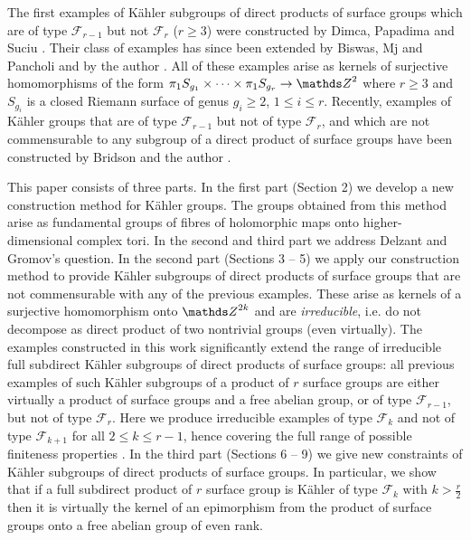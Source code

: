  The first examples of K\"ahler subgroups of direct products of surface groups which are of type  $\mathcal{F}_{r-1}$ but not $\mathcal{F}_r$ ($r\geq 3$) were constructed by Dimca, Papadima and Suciu \cite{DimPapSuc-09-II}. Their class of examples has since been extended by Biswas, Mj and Pancholi \cite{BisMjPan-14} and by the author \cite{Llo-16-II}. All of these examples arise as kernels of surjective homomorphisms of the form $\pi_1S_{g_1}\times \cdots \times \pi_1 S_{g_r}\rightarrow \ZZ^2$ where $r\geq 3$ and $S_{g_i}$ is a closed Riemann surface of genus $g_i\geq 2$, $1\leq i \leq r$. Recently, examples of K\"ahler groups that are of type $\mathcal{F}_{r-1}$ but not of type $\mathcal{F}_r$, and which are not commensurable to any subgroup of a direct product of surface groups have been constructed by Bridson and the author \cite{BriLlo-16}. 
 
 This paper consists of three parts. In the first part (Section 2) we develop a new construction method for K\"ahler groups. The groups obtained from this method arise as fundamental groups of fibres of holomorphic maps onto higher-dimensional complex tori. In the second and third part we address Delzant and Gromov's question. In the second part (Sections 3 -- 5) we apply our construction method to provide K\"ahler subgroups of direct products of surface groups that are not commensurable with any of the previous examples. These arise as kernels of a surjective homomorphism onto $\ZZ^{2k}$ and are \textit{irreducible}, i.e. do not decompose as direct product of two nontrivial groups (even virtually). The examples constructed in this work significantly extend the range of irreducible full subdirect K\"ahler subgroups of direct products of surface groups: all previous examples of such K\"ahler subgroups of a product of $r$ surface groups are either virtually a product of surface groups and a free abelian group, or of type $\mathcal{F}_{r-1}$, but not of type $\mathcal{F}_r$. Here we produce irreducible examples of type $\mathcal{F}_k$ and not of type $\mathcal{F}_{k+1}$ for all $2\leq k \leq r-1$, hence covering the full range of possible finiteness properties \cite{BriHowMilSho-02, BriHowMilSho-09}. In the third part (Sections 6 -- 9) we give new constraints of K\"ahler subgroups of direct products of surface groups. In particular, we show that if a full subdirect product of $r$ surface group is K\"ahler of type $\mathcal{F}_k$ with $k> \frac{r}{2}$ then it is virtually the kernel of an epimorphism from the product of surface groups onto a free abelian group of even rank.
 


